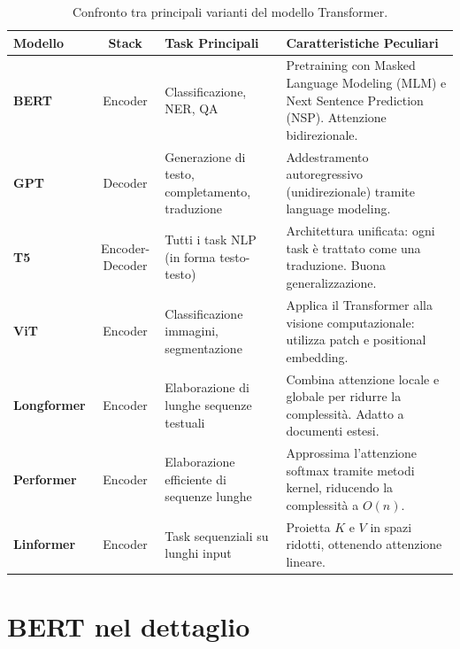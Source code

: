 \begin{table}
    \centering
    \renewcommand{\arraystretch}{1.3}
    \caption{Confronto tra principali varianti del modello Transformer.}
    \label{tab:transformer_variants}
    \begin{tabularx}{\textwidth}{>{\bfseries}l c X X}
        \toprule
        Modello & Stack & Task Principali & Caratteristiche Peculiari \\
        \midrule
        BERT & Encoder & Classificazione, NER, QA &
        Pretraining con Masked Language Modeling (MLM) e Next Sentence Prediction (NSP). Attenzione bidirezionale. \\
        GPT & Decoder & Generazione di testo, completamento, traduzione &
        Addestramento autoregressivo (unidirezionale) tramite language modeling. \\
        T5 & Encoder-Decoder & Tutti i task NLP (in forma testo-testo) &
        Architettura unificata: ogni task è trattato come una traduzione. Buona generalizzazione. \\
        ViT & Encoder & Classificazione immagini, segmentazione &
        Applica il Transformer alla visione computazionale: utilizza patch e positional embedding. \\
        Longformer & Encoder & Elaborazione di lunghe sequenze testuali &
        Combina attenzione locale e globale per ridurre la complessità. Adatto a documenti estesi. \\
        Performer & Encoder & Elaborazione efficiente di sequenze lunghe &
        Approssima l’attenzione softmax tramite metodi kernel, riducendo la complessità a $O(n)$. \\
        Linformer & Encoder & Task sequenziali su lunghi input &
        Proietta $K$ e $V$ in spazi ridotti, ottenendo attenzione lineare. \\
        \bottomrule
    \end{tabularx}
\end{table}


\section{BERT nel dettaglio}

